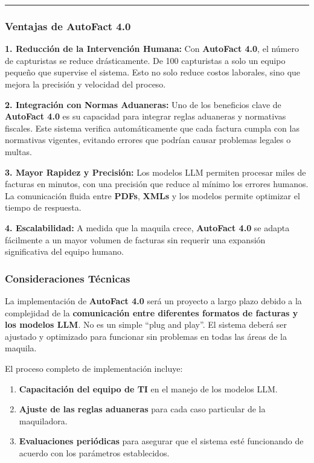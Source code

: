 \documentclass[
  10pt,
  letterpaper,
]{book}
\providecommand{\tightlist}{%
  \setlength{\itemsep}{0pt}\setlength{\parskip}{0pt}}\usepackage{longtable,booktabs,array}
\begin{document}
\begin{center}\rule{0.5\linewidth}{0.5pt}\end{center}

\subsubsection{Ventajas de AutoFact 4.0}\label{ventajas-de-autofact-4.0}

\textbf{1. Reducción de la Intervención Humana:} Con \textbf{AutoFact
4.0}, el número de capturistas se reduce drásticamente. De 100
capturistas a solo un equipo pequeño que supervise el sistema. Esto no
solo reduce costos laborales, sino que mejora la precisión y velocidad
del proceso.

\textbf{2. Integración con Normas Aduaneras:} Uno de los beneficios
clave de \textbf{AutoFact 4.0} es su capacidad para integrar reglas
aduaneras y normativas fiscales. Este sistema verifica automáticamente
que cada factura cumpla con las normativas vigentes, evitando errores
que podrían causar problemas legales o multas.

\textbf{3. Mayor Rapidez y Precisión:} Los modelos LLM permiten procesar
miles de facturas en minutos, con una precisión que reduce al mínimo los
errores humanos. La comunicación fluida entre \textbf{PDFs},
\textbf{XMLs} y los modelos permite optimizar el tiempo de respuesta.

\textbf{4. Escalabilidad:} A medida que la maquila crece,
\textbf{AutoFact 4.0} se adapta fácilmente a un mayor volumen de
facturas sin requerir una expansión significativa del equipo humano.

\subsubsection{Consideraciones
Técnicas}\label{consideraciones-tuxe9cnicas}

La implementación de \textbf{AutoFact 4.0} será un proyecto a largo
plazo debido a la complejidad de la \textbf{comunicación entre
diferentes formatos de facturas y los modelos LLM}. No es un simple
``plug and play''. El sistema deberá ser ajustado y optimizado para
funcionar sin problemas en todas las áreas de la maquila.

El proceso completo de implementación incluye:

\begin{enumerate}
\def\labelenumi{\arabic{enumi}.}
\tightlist
\item
  \textbf{Capacitación del equipo de TI} en el manejo de los modelos
  LLM.
\item
  \textbf{Ajuste de las reglas aduaneras} para cada caso particular de
  la maquiladora.
\item
  \textbf{Evaluaciones periódicas} para asegurar que el sistema esté
  funcionando de acuerdo con los parámetros establecidos.
\end{enumerate}
\end{document}
